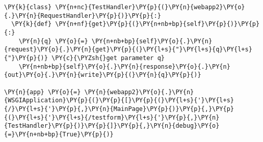 \begin{Verbatim}[commandchars=\\\{\}]
\PY{k}{class} \PY{n+nc}{TestHandler}\PY{p}{(}\PY{n}{webapp2}\PY{o}{.}\PY{n}{RequestHandler}\PY{p}{)}\PY{p}{:}
  \PY{k}{def} \PY{n+nf}{get}\PY{p}{(}\PY{n+nb+bp}{self}\PY{p}{)}\PY{p}{:}
    \PY{n}{q} \PY{o}{=} \PY{n+nb+bp}{self}\PY{o}{.}\PY{n}{request}\PY{o}{.}\PY{n}{get}\PY{p}{(}\PY{l+s}{"}\PY{l+s}{q}\PY{l+s}{"}\PY{p}{)} \PY{c}{\PYZsh{}get parameter q}
    \PY{n+nb+bp}{self}\PY{o}{.}\PY{n}{response}\PY{o}{.}\PY{n}{out}\PY{o}{.}\PY{n}{write}\PY{p}{(}\PY{n}{q}\PY{p}{)}

\PY{n}{app} \PY{o}{=} \PY{n}{webapp2}\PY{o}{.}\PY{n}{WSGIApplication}\PY{p}{(}\PY{p}{[}\PY{p}{(}\PY{l+s}{'}\PY{l+s}{/}\PY{l+s}{'}\PY{p}{,}\PY{n}{MainPage}\PY{p}{)}\PY{p}{,}\PY{p}{(}\PY{l+s}{'}\PY{l+s}{/testform}\PY{l+s}{'}\PY{p}{,}\PY{n}{TestHandler}\PY{p}{)}\PY{p}{]}\PY{p}{,}\PY{n}{debug}\PY{o}{=}\PY{n+nb+bp}{True}\PY{p}{)}
\end{Verbatim}
